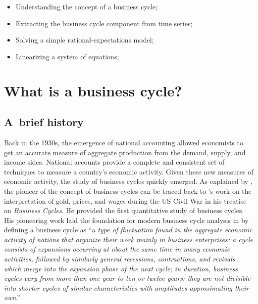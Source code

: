 \documentclass[a4paper,12pt]{article}%
\begin{document}
\FRONTPAGE%

\vspace{4ex}
\begin{myobjs}%


\begin{itemize}
\item Understanding the concept of a business cycle;

\item Extracting the business cycle component from time series;

\item Solving a simple rational-expectations model;

\item Linearizing a system of equations;
\end{itemize}

%

\end{myobjs}%


\newpage

\section{What is a business cycle?}

\subsection{A\ brief history}
Back in the 1930s, the emergence of national accounting allowed economists to
get an accurate measure of aggregate production from the demand, supply, and
income sides. National accounts provide a complete and consistent set of
techniques to measure a country's economic activity. Given these new measures
of economic activity, the study of business cycles quickly emerged. As
explained by \cite{schumpeter1930mitchell}, the pioneer of the concept of
business cycles can be traced back to \cite{mitchell1913business}'s work on the
interpretation of gold, prices, and wages during the US Civil War in his
treatise on \textit{Business Cycles}. He provided the first quantitative
study of business cycles. His pioneering work laid the foundation for modern
business cycle analysis in \cite{burns1946measuring} by defining a business
cycle as \textquotedblleft a \textit{type of fluctuation found in the
aggregate economic activity of nations that organize their work mainly in
business enterprises: a cycle consists of expansions occurring at about the
same time in many economic activities, followed by similarly general
recessions, contractions, and revivals which merge into the expansion phase of
the next cycle; in duration, business cycles vary from more than one year to
ten or twelve years; they are not divisible into shorter cycles of similar
characteristics with amplitudes approximating their own}.\textquotedblright
\end{document}
